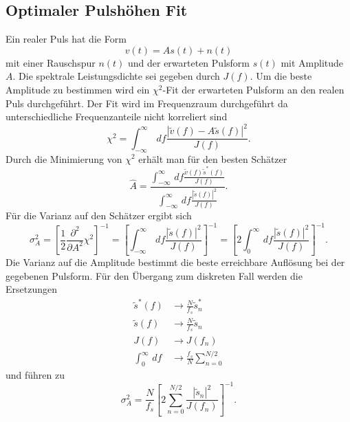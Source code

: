 \subsection{Optimaler Pulshöhen Fit}
Ein realer Puls hat die Form
\begin{equation}
v(t) = As(t) + n(t)
\end{equation}
mit einer Rauschspur $n(t)$ und der erwarteten Pulsform $s(t)$ mit Amplitude $A$.
Die spektrale Leistungsdichte sei gegeben durch $J(f)$.
Um die beste Amplitude zu bestimmen wird ein $\chi^2$-Fit der erwarteten Pulsform an den realen Puls durchgeführt.
Der Fit wird im Frequenzraum durchgeführt da unterschiedliche Frequenzanteile nicht korreliert sind
\begin{equation}
\chi^2 = \int_{-\infty}^\infty\, df \frac{|\widetilde{v}(f) - A\widetilde{s}(f)|^2}{J(f)}.
\end{equation}
Durch die Minimierung von $\chi^2$ erhält man für den besten Schätzer
\begin{equation}
\hat{A} = \frac{\int_{-\infty}^\infty\, df \frac{\widetilde{v}(f)\widetilde{s}^*(f)}{J(f)}}{\int_{-\infty}^\infty\, df \frac{|\widetilde{s}(f)|^2}{J(f)}}.
\end{equation}
Für die Varianz auf den Schätzer ergibt sich
\begin{equation}
\sigma^2_A = \left[\frac{1}{2}\frac{\partial^2}{\partial A^2}\chi^2\right]^{-1} = \left[\int_{-\infty}^\infty\, df \frac{|\widetilde{s}(f)|^2}{J(f)} \right ]^{-1} = \left[2\int_{0}^\infty\, df \frac{|\widetilde{s}(f)|^2}{J(f)} \right ]^{-1}.
\end{equation}
Die Varianz auf die Amplitude bestimmt die beste erreichbare Auflösung bei der gegebenen Pulsform.
Für den Übergang zum diskreten Fall werden die Ersetzungen 
\begin{align*}
\widetilde{s}^*(f) &\rightarrow \frac{N}{f_s} \widetilde{s}^*_n \\
\widetilde{s}(f) &\rightarrow \frac{N}{f_s} \widetilde{s}_n \\
J(f) &\rightarrow J(f_n) \\
\int_{0}^\infty\, df &\rightarrow \frac{f_s}{N}\sum_{n=0}^{N/2}
\end{align*}
und führen zu
\begin{equation}
\sigma^2_A = \frac{N}{f_s}\left[2 \sum_{n=0}^{N/2} \frac{|\widetilde{s}_n|^2}{J(f_n)}\right]^{-1}.
\end{equation}
